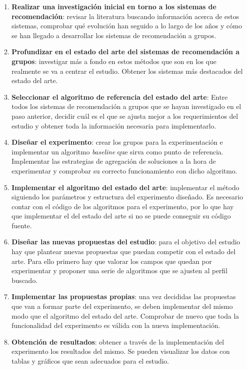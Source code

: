 \begin{enumerate}
	\item{\textbf{Realizar una investigación inicial en torno a los sistemas de recomendación}: revisar la literatura buscando información acerca de estos sistemas, comprobar qué evolución han seguido a lo largo de los años y cómo se han llegado a desarrollar los sistemas de recomendación a grupos.}
	\item{\textbf{Profundizar en el estado del arte del sistemas de recomendación a grupos}: investigar más a fondo en estos métodos que son en los que realmente se va a centrar el estudio. Obtener los sistemas más destacados del estado del arte.}
	\item{\textbf{Seleccionar el algoritmo de referencia del estado del arte}: Entre todos los sistemas de recomendación a grupos que se hayan investigado en el paso anterior, decidir cuál es el que se ajusta mejor a los requerimientos del estudio y obtener toda la información necesaria para implementarlo.}
	\item{\textbf{Diseñar el experimento}: crear los grupos para la experimentación e implementar un algoritmo \textit{baseline} que sirva como punto de referencia. Implementar las estrategias de agregación de soluciones a la hora de experimentar y comprobar su correcto funcionamiento con dicho algoritmo.}
	\item{\textbf{Implementar el algoritmo del estado del arte}: implementar el método siguiendo los parámetros y estructura del experimento diseñado. Es necesario contar con el código de los algoritmos para el experimento, por lo que hay que implementar el del estado del arte si no se puede conseguir su código fuente.}
	\item{\textbf{Diseñar las nuevas propuestas del estudio}: para el objetivo del estudio hay que plantear nuevas propuestas que puedan competir con el estado del arte. Para ello primero hay que valorar los campos que quedan por experimentar y proponer una serie de algoritmos que se ajusten al perfil buscado.}
	\item{\textbf{Implementar las propuestas propias}: una vez decididas las propuestas que van a formar parte del experimento, se deben implementar del mismo modo que el algoritmo del estado del arte. Comprobar de nuevo que toda la funcionalidad del experimento es válida con la nueva implementación.}
	\item{\textbf{Obtención de resultados}: obtener a través de la implementación del experimento los resultados del mismo. Se pueden visualizar los datos con tablas y gráficos que sean adecuados para el estudio.}

\end{enumerate}
